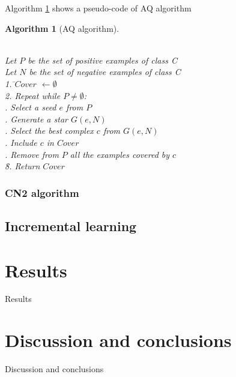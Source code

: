 \documentclass[preprint,3p,twocolumn]{elsarticle}
\newtheorem{algorithm}{Algorithm}[section]
\begin{document}
Algorithm \ref{algo:AQ} shows a pseudo-code of AQ algorithm
\begin{algorithm}[AQ algorithm]
\begin{tabbing}
\\Let $P$ be the set of positive examples of class C
\\Let $N$ be the set of negative examples of class C\\
1. \=$Cover$ $\leftarrow \emptyset $ \\
2. Repeat while $P \neq \emptyset$:\\
 . Select a seed $e$ from $P$\\
 . Generate a star $G(e,N)$\\
 . Select the best complex $c$ from $G(e,N)$\\
 . Include $c$ in $Cover$\\
 . Remove from $P$ all the examples covered by $c$\\
\=8. Return $Cover$
\end{tabbing}
\label{algo:AQ}
\end{algorithm}

\subsubsection{CN2 algorithm}

\subsection{Incremental learning}


\section{Results}
\label{sec:results}
Results

\section{Discussion and conclusions}
\label{sec:conclusions}
Discussion and conclusions



\end{document}
